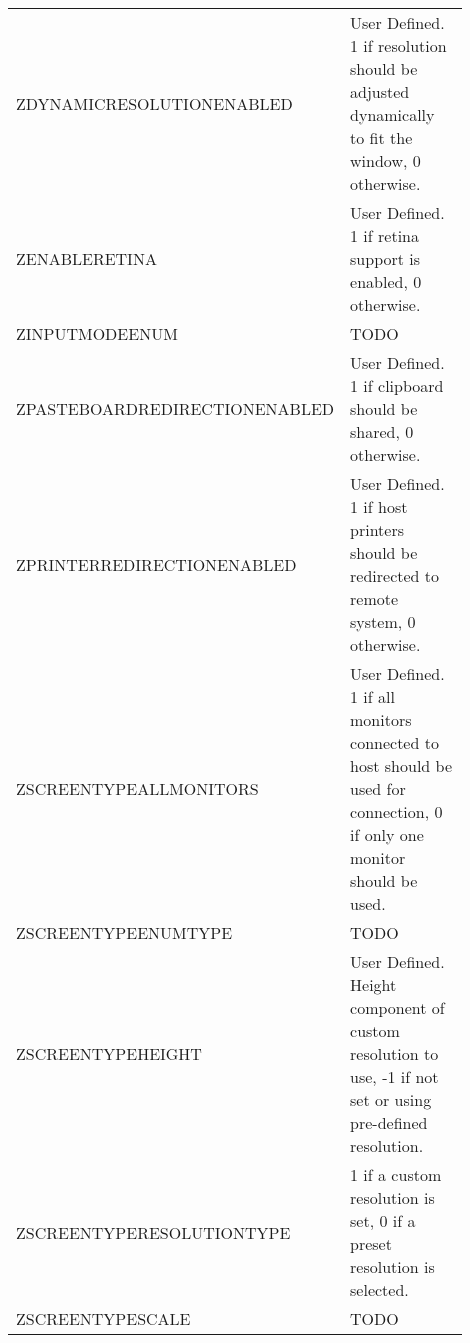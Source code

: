 \documentclass[journal]{IEEEtran}
\begin{document}
\begin{table}[h!]
\begin{tabular}{p{0.3\linewidth} | p{0.6\linewidth}}
ZDYNAMICRESOLUTIONENABLED     & User Defined. 1 if resolution should be adjusted dynamically to fit the window, 0 otherwise. \\
ZENABLERETINA                 & User Defined. 1 if retina support is enabled, 0 otherwise.                                                                                                                                     \\
ZINPUTMODEENUM                & TODO                                                                                                                                                                                           \\
ZPASTEBOARDREDIRECTIONENABLED & User Defined. 1 if clipboard should be shared, 0 otherwise.                                                                                                                                    \\
ZPRINTERREDIRECTIONENABLED    & User Defined. 1 if host printers should be redirected to remote system, 0 otherwise.                                                                                                                                                                                           \\
ZSCREENTYPEALLMONITORS        & User Defined. 1 if all monitors connected to host should be used for connection, 0 if only one monitor should be used.                                                                         \\
ZSCREENTYPEENUMTYPE           & TODO                                                                                                                                                                                           \\
ZSCREENTYPEHEIGHT             & 
User Defined. Height component of custom resolution to use, -1 if not set or using pre-defined resolution.                                                                                                                                                                                           \\
ZSCREENTYPERESOLUTIONTYPE     & 1 if a custom resolution is set, 0 if a preset resolution is selected.                                                                                                                                                                                           \\
ZSCREENTYPESCALE              & TODO                                                                                                                                                                                           \\

\end{tabular}
\end{table}
\end{document}
